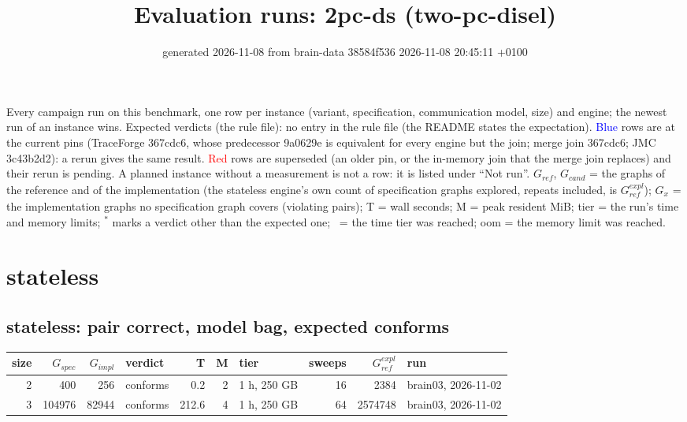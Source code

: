 \documentclass[10pt]{article}
\title{Evaluation runs: \textsf{2pc-ds} (two-pc-disel)}
\author{}
\date{generated 2026-11-08 from brain-data 38584f536 2026-11-08 20:45:11 +0100}
\begin{document}
\maketitle\small
\noindent Every campaign run on this benchmark, one row per instance (variant, specification, communication model, size) and engine; the newest run of an instance wins. Expected verdicts (the rule file): no entry in the rule file (the README states the expectation). \textcolor{blue}{Blue} rows are at the current pins (TraceForge 367cdc6, whose predecessor 9a0629e is equivalent for every engine but the join; merge join 367cdc6; JMC 3c43b2d2): a rerun gives the same result. \textcolor{red}{Red} rows are superseded (an older pin, or the in-memory join that the merge join replaces) and their rerun is pending. A planned instance without a measurement is not a row: it is listed under ``Not run''. $G_{\mathit{ref}}$, $G_{\mathit{cand}}$ = the graphs of the reference and of the implementation (the stateless engine's own count of specification graphs explored, repeats included, is $G_{\mathit{ref}}^{\mathit{expl}}$); $G_x$ = the implementation graphs no specification graph covers (violating pairs); T = wall seconds; M = peak resident MiB; tier = the run's time and memory limits; $^{\ast}$ marks a verdict other than the expected one; \faClock\ = the time tier was reached; oom = the memory limit was reached.

\section*{stateless}
\subsection*{stateless: pair \textsf{correct}, model bag, expected conforms}
\begin{longtable}{@{}rrrlrrlrrl@{}}
\toprule
size & $G_{\mathit{spec}}$ & $G_{\mathit{impl}}$ & verdict & T & M & tier & sweeps & $G_{\mathit{ref}}^{\mathit{expl}}$ & run \\
\midrule
\endhead
\color{blue} 2 & 400 & 256 & conforms & 0.2 & 2 & 1 h, 250 GB & 16 & 2384 & brain03, 2026-11-02 \\
\color{blue} 3 & 104976 & 82944 & conforms & 212.6 & 4 & 1 h, 250 GB & 64 & 2574748 & brain03, 2026-11-02 \\
\bottomrule
\end{longtable}
\end{document}
